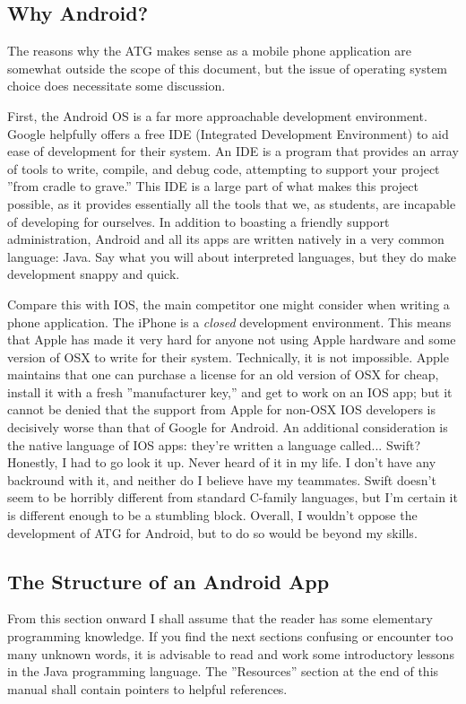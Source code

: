 \subsection{Why Android?}
The reasons why the ATG makes sense as a mobile phone application are somewhat outside the scope of this document, but the issue of
operating system choice does necessitate some discussion.\par
First, the Android OS is a far more approachable development environment. Google helpfully offers a free IDE (Integrated Development Environment) to aid ease of development for their system. An IDE is a program that provides an array of tools to write, compile, and debug code, 
attempting to support your project ''from cradle to grave.'' This IDE is a large part of what makes this project possible, as it provides
essentially all the tools that we, as students, are incapable of developing for ourselves. In addition to boasting a friendly support
administration, Android and all its apps are written natively in a very common language: Java. Say what you will about interpreted
languages, but they do make development snappy and quick.\par
Compare this with IOS, the main competitor one might consider when writing a phone application. The iPhone is a \emph{closed} development
environment. This means that Apple has made it very hard for anyone not using Apple hardware and some version of OSX to write for their system.
Technically, it is not impossible. Apple maintains that one can purchase a license for an old version of OSX for cheap, install it with a
fresh ''manufacturer key,'' and get to work on an IOS app; but it cannot be denied that the support from Apple for non-OSX IOS developers
is decisively worse than that of Google for Android. An additional consideration is the native language of IOS apps: they're written
a language called... Swift? Honestly, I had to go look it up. Never heard of it in my life. I don't have any backround with it, and neither
do I believe have my teammates. Swift doesn't seem to be horribly different from standard C-family languages, but I'm certain it is different
enough to be a stumbling block. Overall, I wouldn't oppose the development of ATG for Android, but to do so would be beyond my skills.

\subsection{The Structure of an Android App}
From this section onward I shall assume that the reader has some elementary programming knowledge. If you find the next sections confusing
or encounter too many unknown words, it is advisable to read and work some introductory lessons in the Java programming language.
The ''Resources'' section at the end of this manual shall contain pointers to helpful references.\cite{javaOracle}

